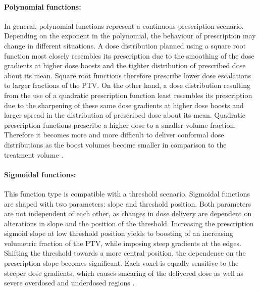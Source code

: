 \paragraph{Polynomial functions: }In general, polynomial functions represent a continuous prescription scenario. Depending on the exponent in the polynomial, the behaviour of prescription may change in different situations. A dose distribution planned using a square root function most closely resembles its prescription due to the smoothing of the dose gradients at higher dose boosts and the tighter distribution of prescribed dose about its mean. Square root functions therefore prescribe lower dose escalations to larger fractions of the PTV. On the other hand, a dose distribution resulting from the use of a quadratic prescription function least resembles its prescription due to the sharpening of these same dose gradients at higher dose boosts and larger spread in the distribution of prescribed dose about its mean. Quadratic prescription functions prescribe a higher dose to a smaller volume fraction. Therefore it becomes more and more difficult to deliver conformal dose distributions as the boost volumes become smaller in comparison to the treatment volume \cite{pmid17921573}.
\paragraph{Sigmoidal functions: }This function type is compatible with a threshold scenario. Sigmoidal functions are shaped with two parameters: slope and threshold position. Both parameters are not independent of each other, as changes in dose delivery are dependent on alterations in slope and the position of the threshold.  Increasing the prescription sigmoid slope at low threshold position yields to boosting of an increasing volumetric fraction of the PTV, while imposing steep gradients at the edges. Shifting the threshold towards a more central position, the dependence on the prescription slope becomes significant. Each voxel is equally sensitive to the steeper dose gradients, which causes smearing of the delivered dose as well as severe overdosed and underdosed regions \cite{pmid17921573}. 
